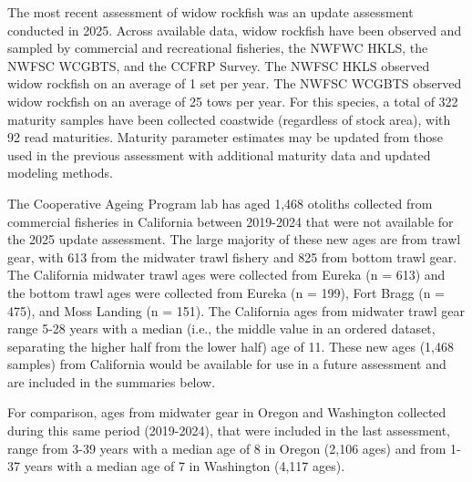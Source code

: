 \documentclass[
  english,
]{article}
\begin{document}
The most recent assessment of widow rockfish was an update assessment
conducted in 2025. Across available data, widow rockfish have been
observed and sampled by commercial and recreational fisheries, the NWFWC
HKLS, the NWFSC WCGBTS, and the CCFRP Survey. The NWFSC HKLS observed
widow rockfish on an average of 1 set per year. The NWFSC WCGBTS
observed widow rockfish on an average of 25 tows per year. For this
species, a total of 322 maturity samples have been collected coastwide
(regardless of stock area), with 92 read maturities. Maturity parameter
estimates may be updated from those used in the previous assessment with
additional maturity data and updated modeling methods.

The Cooperative Ageing Program lab has aged 1,468 otoliths collected
from commercial fisheries in California between 2019-2024 that were not
available for the 2025 update assessment. The large majority of these
new ages are from trawl gear, with 613 from the midwater trawl fishery
and 825 from bottom trawl gear. The California midwater trawl ages were
collected from Eureka (n = 613) and the bottom trawl ages were collected
from Eureka (n = 199), Fort Bragg (n = 475), and Moss Landing (n = 151).
The California ages from midwater trawl gear range 5-28 years with a
median (i.e., the middle value in an ordered dataset, separating the
higher half from the lower half) age of 11. These new ages (1,468
samples) from California would be available for use in a future
assessment and are included in the summaries below.

For comparison, ages from midwater gear in Oregon and Washington
collected during this same period (2019-2024), that were included in the
last assessment, range from 3-39 years with a median age of 8 in Oregon
(2,106 ages) and from 1-37 years with a median age of 7 in Washington
(4,117 ages).
\end{document}
